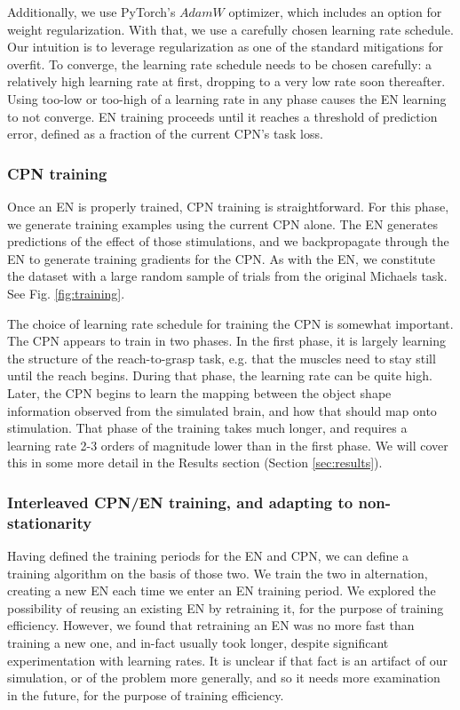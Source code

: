 \documentclass[12pt]{iopart}
\begin{document}
Additionally, we use PyTorch's $AdamW$ optimizer, which includes an option for weight regularization.
With that, we use a carefully chosen learning rate schedule. Our intuition is to leverage regularization as
one of the standard mitigations for overfit. To converge, the learning rate schedule needs
to be chosen carefully: a relatively high learning rate at first, dropping to a very low rate soon
thereafter. Using too-low or too-high of a learning rate in any phase causes the EN learning
to not converge. EN training proceeds until it reaches a threshold of prediction error, defined as
a fraction of the current CPN's task loss.

\subsubsection{CPN training}
Once an EN is properly trained, CPN training is straightforward. For this phase,
we generate training examples using the current CPN alone. The EN generates predictions of the
effect of those stimulations, and we backpropagate through the EN to generate training gradients
for the CPN. As with the EN, we constitute the dataset with a large random sample of trials from
the original Michaels task. See Fig. \ref{fig:training}.

The choice of learning rate schedule for training the CPN is somewhat important.
The CPN appears to train in two phases. In the first phase, it is largely learning the structure
of the reach-to-grasp task, e.g. that the muscles need to stay still until the reach begins. During
that phase, the learning rate can be quite high. Later, the CPN begins to learn the mapping between
the object shape information observed from the simulated brain, and how that should map onto
stimulation. That phase of the training takes much longer, and requires a learning rate 2-3
orders of magnitude lower than in the first phase. We will cover this in some more detail in
the Results section (Section \ref{sec:results}).

\subsubsection{Interleaved CPN/EN training, and adapting to non-stationarity}
Having defined the training periods for the EN and CPN, we can define a training
algorithm on the basis of those two. We train the two in alternation, creating
a new EN each time we enter an EN training period. We explored the possibility
of reusing an existing EN by retraining it, for the purpose of training efficiency.
However, we found that retraining an EN was no more fast than training a new one,
and in-fact usually took longer, despite significant experimentation with learning
rates. It is unclear if that fact is an artifact of our simulation, or of the
problem more generally, and so it needs more examination in the future, for the
purpose of training efficiency.
\end{document}
